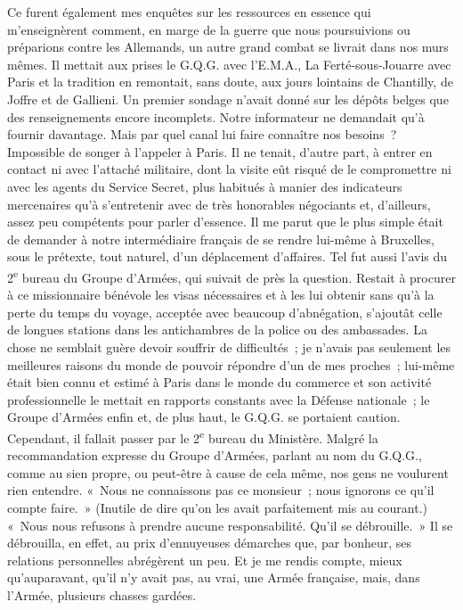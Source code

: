\documentclass[french,twoside]{book} %
\begin{document}
Ce furent également mes enquêtes sur les ressources en essence qui m’enseignèrent comment, en marge de la guerre que nous poursuivions ou préparions contre les Allemands, un autre grand combat se livrait dans nos murs mêmes. Il mettait aux prises le G.Q.G. avec l’E.M.A., La Ferté-sous-Jouarre avec Paris et la tradition en remontait, sans doute, aux jours lointains de Chantilly, de Joffre et de Gallieni. Un premier sondage n’avait donné sur les dépôts belges que des renseignements encore incomplets. Notre informateur ne demandait qu’à fournir davantage. Mais par quel canal lui faire connaître nos besoins ? Impossible de songer à l’appeler à Paris. Il ne tenait, d’autre part, à entrer en contact ni avec l’attaché militaire, dont la visite eût risqué de le compromettre ni avec les agents du Service Secret, plus habitués à manier des indicateurs mercenaires qu’à s’entretenir avec de très honorables négociants et, d’ailleurs, assez peu compétents pour parler d’essence. Il me parut que le plus simple était de demander à notre intermédiaire français de se rendre lui-même à Bruxelles, sous le prétexte, tout naturel, d’un déplacement d’affaires. Tel fut aussi l’avis du 2\textsuperscript{e} bureau du Groupe d’Armées, qui suivait de près la question. Restait à procurer à ce missionnaire bénévole les visas nécessaires et à les lui   obtenir sans qu’à la perte du temps du voyage, acceptée avec beaucoup d’abnégation, s’ajoutât celle de longues stations dans les antichambres de la police ou des ambassades. La chose ne semblait guère devoir souffrir de difficultés ; je n’avais pas seulement les meilleures raisons du monde de pouvoir répondre d’un de mes proches ; lui-même était bien connu et estimé à Paris dans le monde du commerce et son activité professionnelle le mettait en rapports constants avec la Défense nationale ; le Groupe d’Armées enfin et, de plus haut, le G.Q.G. se portaient caution. Cependant, il fallait passer par le 2\textsuperscript{e} bureau du Ministère. Malgré la recommandation expresse du Groupe d’Armées, parlant au nom du G.Q.G., comme au sien propre, ou peut-être à cause de cela même, nos gens ne voulurent rien entendre. « Nous ne connaissons pas ce monsieur ; nous ignorons ce qu’il compte faire. » (Inutile de dire qu’on les avait parfaitement mis au courant.) « Nous nous refusons à prendre aucune responsabilité. Qu’il se débrouille. » Il se débrouilla, en effet, au prix d’ennuyeuses démarches que, par bonheur, ses relations personnelles abrégèrent un peu. Et je me rendis compte, mieux qu’auparavant, qu’il n’y avait pas, au vrai, une Armée française, mais, dans l’Armée, plusieurs chasses gardées.\par
\end{document}
